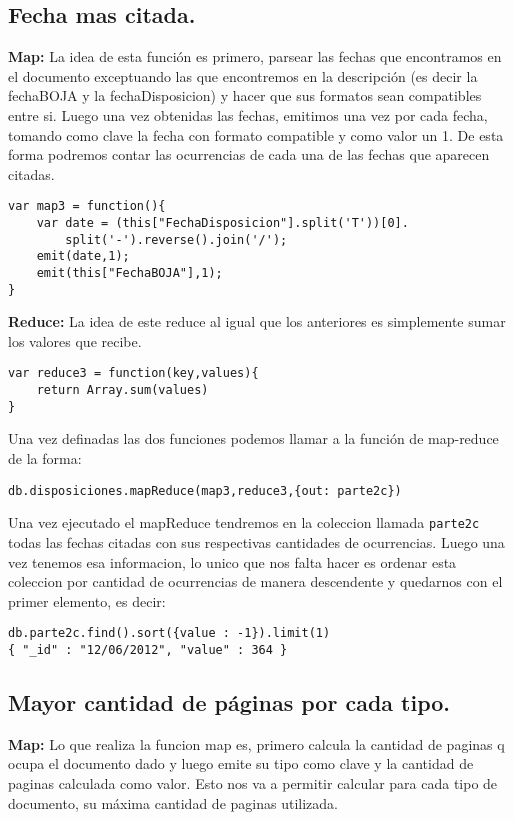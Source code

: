 \subsection{Fecha mas citada.}

\textbf{Map:}
La idea de esta función es primero, parsear las fechas que encontramos en el documento exceptuando las que encontremos en la descripción (es decir la fechaBOJA y la fechaDisposicion) y hacer que sus formatos sean compatibles entre si.
Luego una vez obtenidas las fechas, emitimos una vez por cada fecha, tomando como clave la fecha con formato compatible y como valor un 1.
De esta forma podremos contar las ocurrencias de cada una de las fechas que aparecen citadas.

\begin{lstlisting}
var map3 = function(){
	var date = (this["FechaDisposicion"].split('T'))[0].
		split('-').reverse().join('/');
	emit(date,1);
	emit(this["FechaBOJA"],1);
}
\end{lstlisting}
\textbf{Reduce:}
La idea de este reduce al igual que los anteriores es simplemente sumar los valores que recibe.

\begin{lstlisting}
var reduce3 = function(key,values){
	return Array.sum(values)
}
\end{lstlisting}
Una vez definadas las dos funciones podemos llamar a la función de map-reduce de la forma:

\begin{lstlisting}
db.disposiciones.mapReduce(map3,reduce3,{out: parte2c})
\end{lstlisting}

Una vez ejecutado el mapReduce tendremos en la coleccion llamada \texttt{parte2c} todas las fechas citadas con sus respectivas cantidades de ocurrencias. Luego una vez tenemos esa informacion, lo unico que nos falta hacer es ordenar esta coleccion por cantidad de ocurrencias de manera descendente y quedarnos con el primer elemento, es decir:

\begin{lstlisting}
db.parte2c.find().sort({value : -1}).limit(1)
{ "_id" : "12/06/2012", "value" : 364 }
\end{lstlisting}

\subsection{Mayor cantidad de páginas por cada tipo.}

\textbf{Map:}
Lo que realiza la funcion map es, primero calcula la cantidad de paginas q ocupa el documento dado y luego emite su tipo como clave y la cantidad de paginas calculada como valor. Esto nos va a permitir calcular para cada tipo de documento, su máxima cantidad de paginas utilizada.

